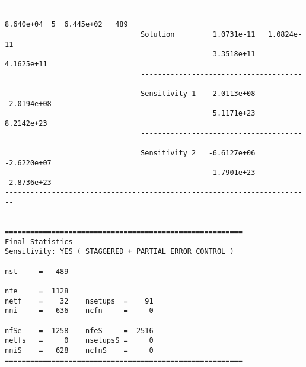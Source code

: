 \begin{verbatim}
------------------------------------------------------------------------
8.640e+04  5  6.445e+02   489
                                Solution         1.0731e-11   1.0824e-11 
                                                 3.3518e+11   4.1625e+11 
                                ----------------------------------------
                                Sensitivity 1   -2.0113e+08  -2.0194e+08 
                                                 5.1171e+23   8.2142e+23 
                                ----------------------------------------
                                Sensitivity 2   -6.6127e+06  -2.6220e+07 
                                                -1.7901e+23  -2.8736e+23 
------------------------------------------------------------------------


========================================================
Final Statistics
Sensitivity: YES ( STAGGERED + PARTIAL ERROR CONTROL )

nst     =   489

nfe     =  1128
netf    =    32    nsetups  =    91
nni     =   636    ncfn     =     0

nfSe    =  1258    nfeS     =  2516
netfs   =     0    nsetupsS =     0
nniS    =   628    ncfnS    =     0
========================================================
\end{verbatim}